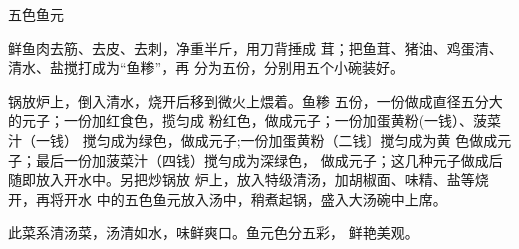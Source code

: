 \begin{recipe}[五福鱼元]{五色鱼元}

\ingredients


\cooking

\step 鲜鱼肉去筋、去皮、去刺，净重半斤，用刀背捶成 茸；把鱼茸、猪油、鸡蛋清、清水、盐搅打成为“鱼糁”，再 分为五份，分别用五个小碗装好。

\step 锅放炉上，倒入清水，烧开后移到微火上煨着。鱼糁 五份，一份做成直径五分大的元子；一份加红食色，揽匀成 粉红色，做成元子；一份加蛋黄粉(一钱）、菠菜汁（一钱） 搅匀成为绿色，做成元子;一份加蛋黄粉（二钱〕搅匀成为黄 色做成元子；最后一份加菠菜汁（四钱）搅勻成为深绿色， 做成元子；这几种元子做成后随即放入开水中。另把炒锅放 炉上，放入特级清汤，加胡椒面、味精、盐等烧开，再将开水 中的五色鱼元放入汤中，稍煮起锅，盛入大汤碗中上席。

\notes

此菜系清汤菜，汤清如水，味鲜爽口。鱼元色分五彩， 鲜艳美观。

\end{recipe}


